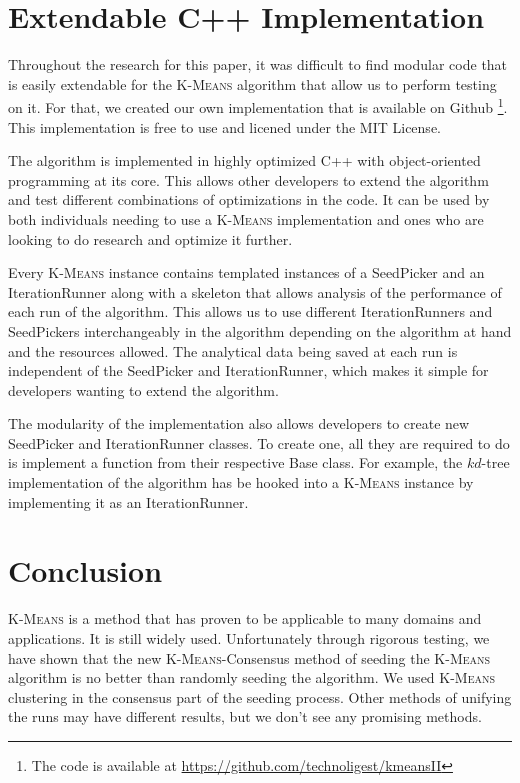 \documentclass[12pt]{dalthesis}
\newcommand*{\kmeansn}{\textsc{K-Means}} %
\newcommand*{\kmeans}{\textsc{K-Means} } %
\begin{document}
\chapter{Extendable C++ Implementation}

Throughout the research for this paper, it was difficult to find modular code that is easily extendable for the \kmeans algorithm that allow us to perform testing on it. For that, we created our own implementation that is available on Github \footnote{The code is available at \url{https://github.com/technoligest/kmeansII}}.  This implementation is free to use and licened under the MIT License.

The algorithm is implemented in highly optimized C++ with object-oriented programming at its core. This allows other developers to extend the algorithm and test different combinations of optimizations in the code. It can be used by both individuals needing to use a \kmeans implementation and ones who are looking to do research and optimize it further. 

Every \kmeans instance contains templated instances of a SeedPicker and an IterationRunner along with a skeleton that allows analysis of the performance of each run of the algorithm. This allows us to use different IterationRunners and SeedPickers interchangeably in the algorithm depending on the algorithm at hand and the resources allowed. The analytical data being saved at each run is independent of the SeedPicker and IterationRunner, which makes it simple for developers wanting to extend the algorithm.

The modularity of the implementation also allows developers to create new SeedPicker and IterationRunner classes. To create one, all they are required to do is implement a function from their respective Base class. For example, the $kd$-tree implementation of the algorithm has be hooked into a \kmeans instance by implementing it as an IterationRunner.



\chapter{Conclusion}

\kmeans is a method that has proven to be applicable to many domains and applications. It is still widely used. Unfortunately through rigorous testing, we have shown that the new \kmeansn-Consensus method of seeding the \kmeans algorithm is no better than randomly seeding the algorithm. We used \kmeans clustering in the consensus part of the seeding process. Other methods of unifying the runs may have different results, but we don't see any promising methods.
\end{document}
